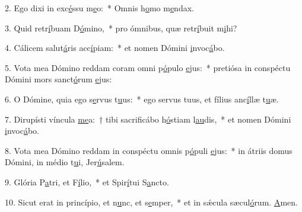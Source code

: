 2. Ego dixi in exc\uline{é}ssu m\uline{e}o:~* Omnis h\uline{o}mo m\uline{e}ndax.\par 
3. Quid retr\uline{í}buam D\uline{ó}mino,~* pro ómnibus, quæ retr\uline{í}buit m\uline{i}hi?\par 
4. Cálicem salut\uline{á}ris acc\uline{í}piam:~* et nomen Dómini \uline{i}nvoc\uline{á}bo.\par 
5. Vota mea Dómino reddam coram omni p\uline{ó}pulo \uline{e}jus:~* pretiósa in conspéctu Dómini mors sanct\uline{ó}rum \uline{e}jus:\par 
6. O Dómine, quia ego s\uline{e}rvus t\uline{u}us:~* ego servus tuus, et fílius anc\uline{í}llæ t\uline{u}æ.\par 
7. Dirupísti víncula \uline{me}a:~† tibi sacrificábo h\uline{ó}stiam l\uline{au}dis,~* et nomen Dómini \uline{i}nvoc\uline{á}bo.\par 
8. Vota mea Dómino reddam in conspéctu omnis p\uline{ó}puli \uline{e}jus:~* in átriis domus Dómini, in médio t\uline{u}i, Jer\uline{ú}salem.\par 
9. Glória P\uline{a}tri, et F\uline{í}lio,~* et Spir\uline{í}tui S\uline{a}ncto.\par 
10. Sicut erat in princípio, et n\uline{u}nc, et s\uline{e}mper,~* et in sǽcula sæcul\uline{ó}rum. \uline{A}men.\par 
